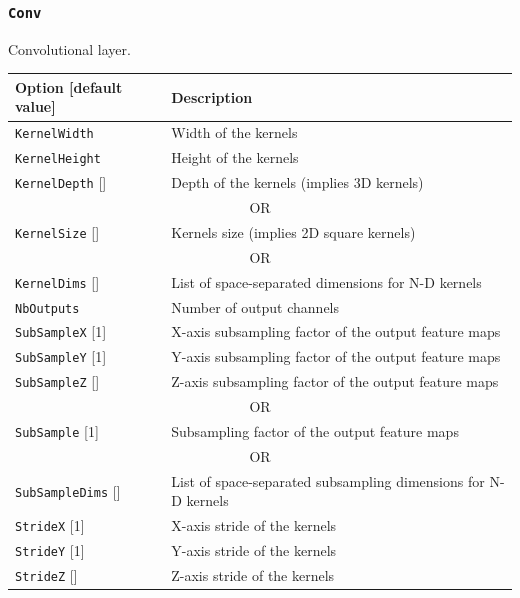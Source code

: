 \documentclass[a4paper,11pt,oneside]{article}
\begin{document}
\subsubsection{\texorpdfstring{%
\lstinline[basicstyle=\ttfamily\bfseries]!Conv!}{Conv}}
Convolutional layer.

\begin{center}
 \begin{longtable}{| p{5cm} | p{10cm} | }
 \hline
 Option [default value] & Description\\
 \hline\hline
  \cellcolor{requiredcolor}\lstinline!KernelWidth! & Width of the kernels \\
  \cellcolor{requiredcolor}\lstinline!KernelHeight! & Height of the kernels \\
  \lstinline!KernelDepth! [] & Depth of the kernels (implies 3D kernels) \\
  \multicolumn{2}{|c|}{\cellcolor{clrgray}\tiny OR} \\
  \cellcolor{requiredcolor}\lstinline!KernelSize! [] & Kernels size (implies 2D square kernels) \\
  \multicolumn{2}{|c|}{\cellcolor{clrgray}\tiny OR} \\
  \cellcolor{requiredcolor}\lstinline!KernelDims! [] & List of space-separated dimensions for N-D kernels \\
  \hline
  \cellcolor{requiredcolor}\lstinline!NbOutputs! & Number of output channels \\
  \hline
  \lstinline!SubSampleX! [1] & X-axis subsampling factor of the output
  feature maps \\
  \lstinline!SubSampleY! [1] & Y-axis subsampling factor of the output
   feature maps \\
  \lstinline!SubSampleZ! [] & Z-axis subsampling factor of the output
   feature maps \\
  \multicolumn{2}{|c|}{\cellcolor{clrgray}\tiny OR} \\
  \lstinline!SubSample! [1] & Subsampling factor of the output feature maps \\
  \multicolumn{2}{|c|}{\cellcolor{clrgray}\tiny OR} \\
  \lstinline!SubSampleDims! [] & List of space-separated subsampling dimensions for N-D kernels \\
  \hline
  \lstinline!StrideX! [1] & X-axis stride of the kernels \\
  \lstinline!StrideY! [1] & Y-axis stride of the kernels \\
  \lstinline!StrideZ! [] & Z-axis stride of the kernels \\

\end{longtable}
\end{center}
\end{document}
